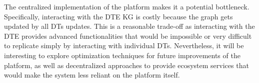 The centralized implementation of the platform makes it a potential bottleneck. Specifically, interacting with the \ac{DTE} KG is costly because the graph gets updated by all \acp{DT} updates.
%
This is a reasonable trade-off as interacting with the \ac{DTE} provides advanced functionalities that would be impossible or very difficult to replicate simply by interacting with individual \acp{DT}.
%
Nevertheless, it will be interesting to explore optimization techniques for future improvements of the platform, as well as decentralized approaches to provide ecosystem services that would make the system less reliant on the platform itself.



